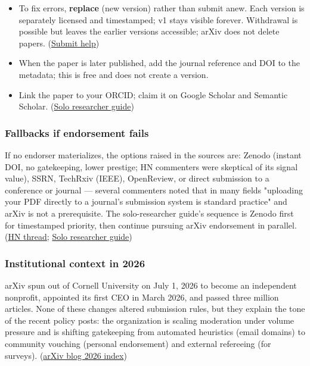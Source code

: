 \documentclass[twocolumn,10pt,letterpaper]{article}
\begin{document}
\begin{itemize}
\setlength{\itemsep}{0pt}
\setlength{\parskip}{0pt}
  \item To fix errors, \textbf{replace} (new version) rather than submit anew. Each version is separately licensed and timestamped; v1 stays visible forever. Withdrawal is possible but leaves the earlier versions accessible; arXiv does not delete papers. (\href{https://info.arxiv.org/help/submit/index.html}{Submit help})
  \item When the paper is later published, add the journal reference and DOI to the metadata; this is free and does not create a version.
  \item Link the paper to your ORCID; claim it on Google Scholar and Semantic Scholar. (\href{https://learnedgeek.com/Blog/Post/solo-researcher-guide-arxiv}{Solo researcher guide})
\end{itemize}

\subsubsection{Fallbacks if endorsement fails}

If no endorser materializes, the options raised in the sources are: Zenodo (instant DOI, no gatekeeping, lower prestige; HN commenters were skeptical of its signal value), SSRN, TechRxiv (IEEE), OpenReview, or direct submission to a conference or journal — several commenters noted that in many fields "uploading your PDF directly to a journal's submission system is standard practice" and arXiv is not a prerequisite. The solo-researcher guide's sequence is Zenodo first for timestamped priority, then continue pursuing arXiv endorsement in parallel. (\href{https://news.ycombinator.com/item?id=46243256}{HN thread}; \href{https://learnedgeek.com/Blog/Post/solo-researcher-guide-arxiv}{Solo researcher guide})


\subsubsection{Institutional context in 2026}

arXiv spun out of Cornell University on July 1, 2026 to become an independent nonprofit, appointed its first CEO in March 2026, and passed three million articles. None of these changes altered submission rules, but they explain the tone of the recent policy posts: the organization is scaling moderation under volume pressure and is shifting gatekeeping from automated heuristics (email domains) to community vouching (personal endorsement) and external refereeing (for surveys). (\href{https://blog.arxiv.org/2026/}{arXiv blog 2026 index})
\end{document}
